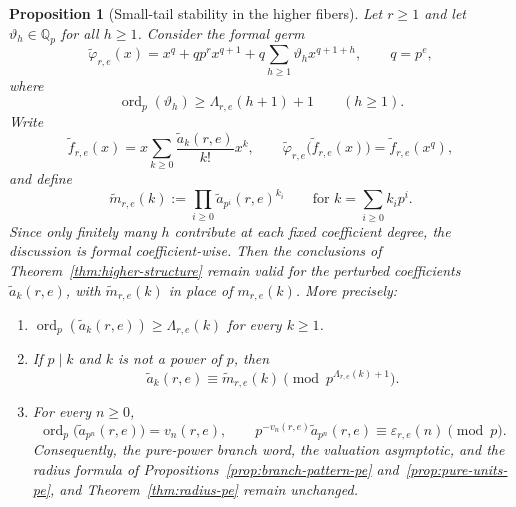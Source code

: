 \documentclass[11pt]{amsart}
\numberwithin{equation}{section}
\newtheorem{proposition}[proposition]{Proposition}
\DeclareMathOperator{\ordop}{ord}
\newcommand{\Qp}{\mathbb{Q}_p}
\newcommand{\vp}{\ordop_p}
\begin{document}
\begin{proposition}[Small-tail stability in the higher fibers]\label{prop:small-tail-higher}
Let $r\ge1$ and let $\vartheta_h\in\Qp$ for all $h\ge1$.  Consider the formal germ
\[
        \widetilde\varphi_{r,e}(x)=x^q+qp^r x^{q+1}+q\sum_{h\ge1}\vartheta_h x^{q+1+h},
        \qquad q=p^e,
\]
where
\[
        \vp(\vartheta_h)\ge \Lambda_{r,e}(h+1)+1
        \qquad(h\ge1).
\]
Write
\[
        \widetilde f_{r,e}(x)=x\sum_{k\ge0}\frac{\widetilde a_k(r,e)}{k!}x^k,
        \qquad
        \widetilde\varphi_{r,e}\bigl(\widetilde f_{r,e}(x)\bigr)=\widetilde f_{r,e}(x^q),
\]
and define
\[
        \widetilde m_{r,e}(k):=\prod_{i\ge0}\widetilde a_{p^i}(r,e)^{k_i}
        \qquad\text{for }k=\sum_{i\ge0}k_ip^i.
\]
Since only finitely many $h$ contribute at each fixed coefficient degree, the discussion is formal coefficient-wise.  Then the conclusions of Theorem~\ref{thm:higher-structure} remain valid for the perturbed coefficients $\widetilde a_k(r,e)$, with $\widetilde m_{r,e}(k)$ in place of $m_{r,e}(k)$.  More precisely:
\begin{enumerate}[label=\textup{(\alph*)},leftmargin=2.2em]
\item $\vp(\widetilde a_k(r,e))\ge \Lambda_{r,e}(k)$ for every $k\ge1$.
\item If $p\mid k$ and $k$ is not a power of $p$, then
\[
        \widetilde a_k(r,e)\equiv \widetilde m_{r,e}(k)\pmod{p^{\Lambda_{r,e}(k)+1}}.
\]
\item For every $n\ge0$,
\[
        \vp\bigl(\widetilde a_{p^n}(r,e)\bigr)=v_n(r,e),
        \qquad
        p^{-v_n(r,e)}\widetilde a_{p^n}(r,e)\equiv \varepsilon_{r,e}(n)\pmod p.
\]
Consequently, the pure-power branch word, the valuation asymptotic, and the radius formula of Propositions~\ref{prop:branch-pattern-pe} and~\ref{prop:pure-units-pe}, and Theorem~\ref{thm:radius-pe} remain unchanged.
\end{enumerate}
\end{proposition}
\end{document}
